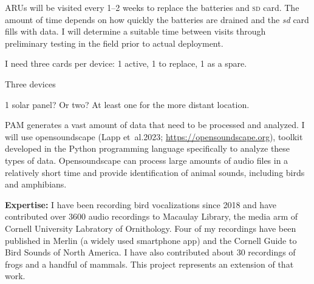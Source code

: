 \documentclass[12pt]{article}
\begin{document}
ARUs will be visited every 1–2 weeks to replace the batteries and \textsc{sd} card. The amount of time depends on how quickly the batteries are drained and the \textit{sd} card fills with data. I will determine a suitable time between visits through preliminary testing in the field prior to actual deployment.



I need three cards per device: 1 active, 1 to replace, 1 as a spare. 

Three devices

1 solar panel? Or two? At least one for the more distant location.


PAM generates a vast amount of data that need to be processed and analyzed. I will use opensoundscape (Lapp et~al.2023; \url{https://opensoundscape.org}), toolkit developed in the Python programming language specifically to analyze these types of data. Opensoundscape can process large amounts of audio files in a relatively short time and provide identification of animal sounds, including birds and amphibians.


\textbf{Expertise:} I have been recording bird vocalizations since 2018 and have contributed over 3600 audio recordings to Macaulay Library, the media arm of Cornell University Labratory of Ornithology. Four of my recordings have been published in Merlin (a widely used smartphone app) and the Cornell Guide to Bird Sounds of North America. I have also contributed about 30 recordings of frogs and a handful of mammals. This project represents an extension of that work.


\newpage


\end{document}
